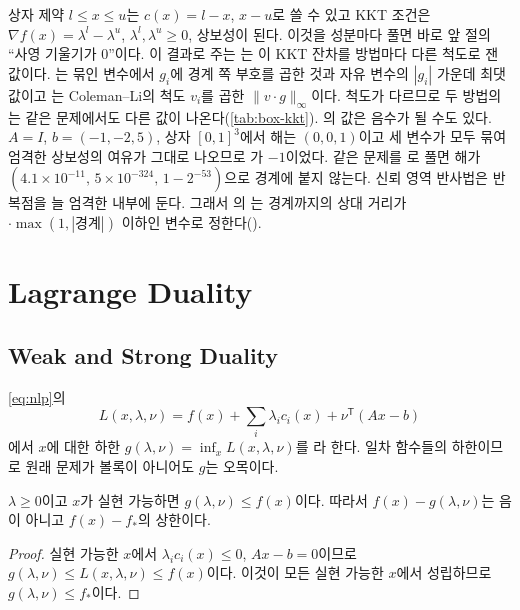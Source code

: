 상자 제약 $l\le x\le u$는 $c(x)=l-x$, $x-u$로 쓸 수 있고 KKT 조건은 $\nabla f(x)=\lambda^l-\lambda^u$, $\lambda^l,\lambda^u\ge0$, 상보성이 된다. 이것을 성분마다 풀면 바로 앞 절의 ``사영 기울기가 $0$''이다. 이 결과로 주는 는 이 KKT 잔차를 방법마다 다른 척도로 잰 값이다. 는 묶인 변수에서 $g_i$에 경계 쪽 부호를 곱한 것과 자유 변수의 $|g_i|$ 가운데 최댓값이고 는 Coleman--Li의 척도 $v_i$를 곱한 $\|v\cdot g\|_\infty$이다. 척도가 다르므로 두 방법의 는 같은 문제에서도 다른 값이 나온다(\cref{tab:box-kkt}). 의 값은 음수가 될 수도 있다. $A=I$, $b=(-1,-2,5)$, 상자 $[0,1]^3$에서 해는 $(0,0,1)$이고 세 변수가 모두 묶여 엄격한 상보성의 여유가 그대로 나오므로 가 $-1$이었다. 같은 문제를 로 풀면 해가 $(4.1\times10^{-11},\,5\times10^{-324},\,1-2^{-53})$으로 경계에 붙지 않는다. 신뢰 영역 반사법은 반복점을 늘 엄격한 내부에 둔다. 그래서 의 는 경계까지의 상대 거리가 $\cdot\max(1,|\text{경계}|)$ 이하인 변수로 정한다().

\section{Lagrange Duality}
\label{sec:duality}

\subsection{Weak and Strong Duality}

\cref{eq:nlp}의 
\[
L(x,\lambda,\nu)=f(x)+\sum_i\lambda_ic_i(x)+\nu^{\mathsf T}(Ax-b)
\]
에서 $x$에 대한 하한 $g(\lambda,\nu)=\inf_xL(x,\lambda,\nu)$를 라 한다. 일차 함수들의 하한이므로 원래 문제가 볼록이 아니어도 $g$는 오목이다.

\begin{proposition}[약쌍대성]
\label{prop:weak-duality}
$\lambda\ge0$이고 $x$가 실현 가능하면 $g(\lambda,\nu)\le f(x)$이다. 따라서  $f(x)-g(\lambda,\nu)$는 음이 아니고 $f(x)-f_\ast$의 상한이다.
\end{proposition}

\begin{proof}
실현 가능한 $x$에서 $\lambda_ic_i(x)\le0$, $Ax-b=0$이므로 $g(\lambda,\nu)\le L(x,\lambda,\nu)\le f(x)$이다. 이것이 모든 실현 가능한 $x$에서 성립하므로 $g(\lambda,\nu)\le f_\ast$이다.
\end{proof}

